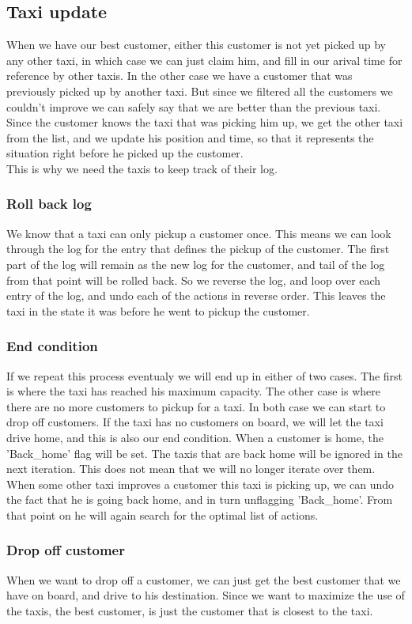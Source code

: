 \subsection{Taxi update}
When we have our best customer, either this customer is not yet picked up by any other taxi, in which case we can just claim him, and fill in our arival time for reference by other taxis. In the other case we have a customer that was previously picked up by another taxi. But since we filtered all the customers we couldn't improve we can safely say that we are better than the previous taxi.\\
Since the customer knows the taxi that was picking him up, we get the other taxi from the list, and we update his position and time, so that it represents the situation right before he picked up the customer.\\
This is why we need the taxis to keep track of their log.
\subsubsection{Roll back log}
We know that a taxi can only pickup a customer once. This means we can look through the log for the entry that defines the pickup of the customer. The first part of the log will remain as the new log for the customer, and tail of the log from that point will be rolled back. So we reverse the log, and loop over each entry of the log, and undo each of the actions in reverse order. This leaves the taxi in the state it was before he went to pickup the customer.
\subsubsection{End condition}
If we repeat this process eventualy we will end up in either of two cases. The first is where the taxi has reached his maximum capacity. The other case is where there are no more customers to pickup for a taxi. In both case we can start to drop off customers. If the taxi has no customers on board, we will let the taxi drive home, and this is also our end condition. When a customer is home, the 'Back\_home' flag will be set. The taxis that are back home will be ignored in the next iteration. This does not mean that we will no longer iterate over them. When some other taxi improves a customer this taxi is picking up, we can undo the fact that he is going back home, and in turn unflagging 'Back\_home'. From that point on he will again search for the optimal list of actions.
\subsubsection{Drop off customer}
When we want to drop off a customer, we can just get the best customer that we have on board, and drive to his destination. Since we want to maximize the use of the taxis, the best customer, is just the customer that is closest to the taxi.
